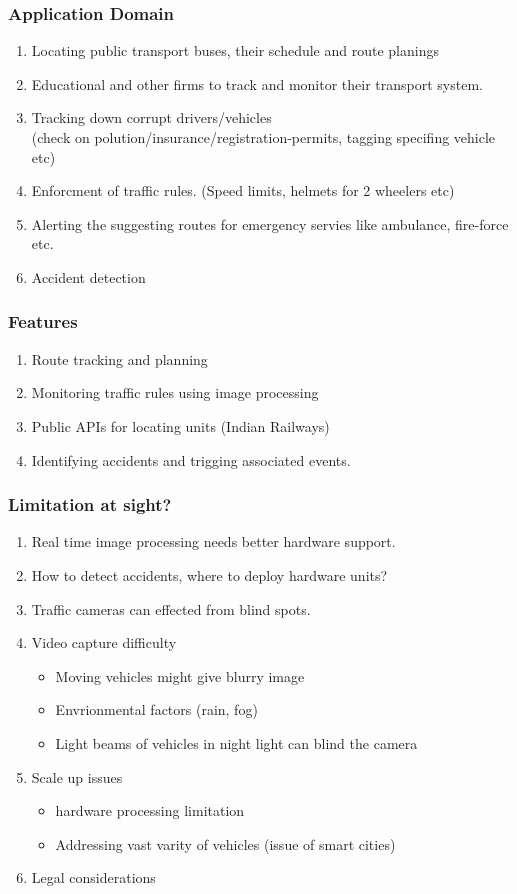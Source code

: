 \documentclass{beamer}
\begin{document}
\begin{frame}
	\frametitle{Application Domain}
	\begin{enumerate}
		\item Locating public transport buses, their schedule and route planings
		\item Educational and other firms to track and monitor their transport system.
		\item Tracking down corrupt drivers/vehicles \\(check on polution/insurance/registration-permits, tagging specifing vehicle etc)
		\item Enforcment of traffic rules. (Speed limits, helmets for 2 wheelers etc)
		\item Alerting the suggesting routes for emergency servies like ambulance, fire-force etc.
		\item Accident detection
	\end{enumerate}
\end{frame}

\begin{frame}
	\frametitle{Features}
	\begin{enumerate}
		\item Route tracking and planning
		\item Monitoring traffic rules using image processing
		\item Public APIs for locating units (Indian Railways)
		\item Identifying accidents and trigging associated events.
	\end{enumerate}
\end{frame}


\begin{frame}
	\frametitle{Limitation at sight?}
	\begin{enumerate}
		\item Real time image processing needs better hardware support.	
		\item How to detect accidents, where to deploy hardware units?
		\item Traffic cameras can effected from blind spots.
		\item Video capture difficulty
		\begin{itemize}
			\item Moving vehicles might give blurry image
			\item Envrionmental factors (rain, fog)
			\item Light beams of vehicles in night light can blind the camera
		\end{itemize}
		\item Scale up issues
		\begin{itemize}
			\item hardware processing limitation
			\item Addressing vast varity of vehicles (issue of smart cities)	
		\end{itemize}
		\item Legal considerations
	\end{enumerate}
\end{frame}
\end{document}
